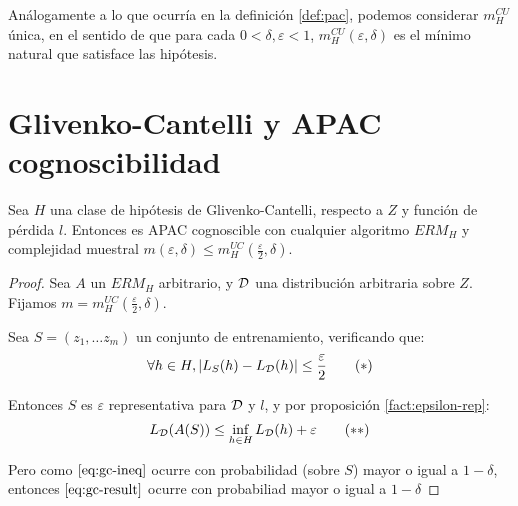 Análogamente a lo que ocurría en la definición \ref{def:pac}, podemos considerar $m_H^{CU}$ única, en el sentido de
que para cada $0 < \delta, \varepsilon < 1$, $m_{H}^{CU}(\varepsilon, \delta)$ es el mínimo natural que satisface las 
hipótesis.

\section{Glivenko-Cantelli y APAC cognoscibilidad}

\begin{theorem}
Sea $H$ una clase de hipótesis de Glivenko-Cantelli, respecto a $Z$ y función de pérdida $l$. 
Entonces es APAC cognoscible con cualquier algoritmo $ERM_H$ y complejidad muestral
$m(\varepsilon, \delta) \le m_{H}^{UC} \left(\frac{\varepsilon}{2}, \delta \right)$. 
\label{th:gc-apac}
\end{theorem}

  \begin{proof}
   Sea $A$ un $ERM_H$ arbitrario, y $\mathcal{D}$ una distribución arbitraria sobre $Z$.
   Fijamos $m = m_{H}^{UC} \left(\frac{\varepsilon}{2}, \delta \right)$.

   Sea $S = (z_1, \ldots z_m)$ un conjunto de entrenamiento, verificando que: 
   \begin{equation}
     \forall h\in H, |L_{S}(h)-L_{\mathcal{D}}(h)| \le \frac{\varepsilon}{2}
     \label{eq:gc-ineq}\tag{$\ast$}
   \end{equation}

   Entonces $S$ es $\varepsilon$ representativa para $\mathcal{D}$ y $l$, y por proposición \ref{fact:epsilon-rep}:
   \begin{equation}
    L_{\mathcal{D}}(A(S)) \le \inf_{h\in H} L_{\mathcal{D}}(h) + \varepsilon
    \label{eq:gc-result}\tag{$\ast$$\ast$}
   \end{equation}

   Pero como $\eqref{eq:gc-ineq}$ ocurre con probabilidad (sobre $S$) mayor o igual a $1-\delta$, entonces 
   $\eqref{eq:gc-result}$ ocurre con probabiliad mayor o igual a $1-\delta$
  \end{proof}
  
